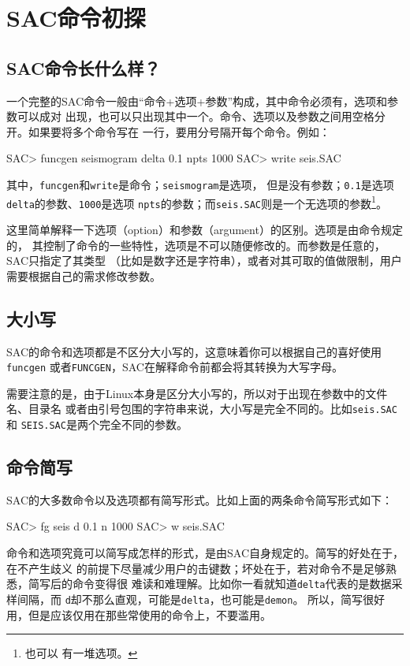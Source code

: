 \section{SAC命令初探}
\subsection{SAC命令长什么样？}
一个完整的SAC命令一般由``命令+选项+参数''构成，其中命令必须有，选项和参数可以成对
出现，也可以只出现其中一个。命令、选项以及参数之间用空格分开。如果要将多个命令写在
一行，要用分号隔开每个命令。例如：
\begin{SACCode}
SAC> funcgen seismogram delta 0.1 npts 1000
SAC> write seis.SAC
\end{SACCode}
其中，\lstinline{funcgen}和\lstinline{write}是命令；\lstinline{seismogram}是选项，
但是没有参数；\lstinline{0.1}是选项\lstinline{delta}的参数、\lstinline{1000}是选项
\lstinline{npts}的参数；而\lstinline{seis.SAC}则是一个无选项的参数\footnote{也可以
有一堆选项。}。

这里简单解释一下选项（option）和参数（argument）的区别。选项是由命令规定的，
其控制了命令的一些特性，选项是不可以随便修改的。而参数是任意的，SAC只指定了其类型
（比如是数字还是字符串），或者对其可取的值做限制，用户需要根据自己的需求修改参数。

\subsection{大小写}
SAC的命令和选项都是不区分大小写的，这意味着你可以根据自己的喜好使用\lstinline{funcgen}
或者\lstinline{FUNCGEN}，SAC在解释命令前都会将其转换为大写字母。

需要注意的是，由于Linux本身是区分大小写的，所以对于出现在参数中的文件名、目录名
或者由引号包围的字符串来说，大小写是完全不同的。比如\lstinline{seis.SAC}和
\lstinline{SEIS.SAC}是两个完全不同的参数。

\subsection{命令简写}
SAC的大多数命令以及选项都有简写形式。比如上面的两条命令简写形式如下：
\begin{SACCode}
SAC> fg seis d 0.1 n 1000
SAC> w seis.SAC
\end{SACCode}

命令和选项究竟可以简写成怎样的形式，是由SAC自身规定的。简写的好处在于，在不产生歧义
的前提下尽量减少用户的击键数；坏处在于，若对命令不是足够熟悉，简写后的命令变得很
难读和难理解。比如你一看就知道\lstinline{delta}代表的是数据采样间隔，而
\lstinline{d}却不那么直观，可能是\lstinline{delta}，也可能是\lstinline{demon}。
所以，简写很好用，但是应该仅用在那些常使用的命令上，不要滥用。

